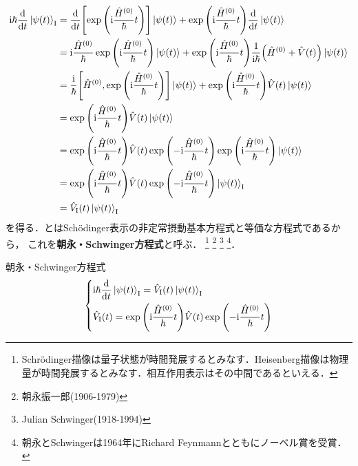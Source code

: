 \documentclass{report}
\begin{document}
  \begin{align}
    \mathrm{i}\hbar\dv{t}\ket{\psi(t)}_{\mathrm{I}} &= \dv{t}\qty[\exp\qty(\mathrm{i}\frac{\hat{H}^{(0)}}{\hbar}t)]\ket{\psi(t)} + \exp\qty(\mathrm{i}\frac{\hat{H}^{(0)}}{\hbar}t)\dv{t}\ket{\psi(t)} \\
    &= \mathrm{i}\frac{\hat{H}^{(0)}}{\hbar}\exp\qty(\mathrm{i}\frac{\hat{H}^{(0)}}{\hbar}t)\ket{\psi(t)} + \exp\qty(\mathrm{i}\frac{\hat{H}^{(0)}}{\hbar}t)\frac{1}{\mathrm{i}\hbar}\qty(\hat{H}^{(0)} + \hat{V}(t))\ket{\psi(t)} \\ 
    &= \frac{\mathrm{i}}{\hbar}\qty[\hat{H}^{(0)}, \exp\qty(\mathrm{i}\frac{\hat{H}^{(0)}}{\hbar}t)]\ket{\psi(t)} + \exp\qty(\mathrm{i}\frac{\hat{H}^{(0)}}{\hbar}t)\hat{V}(t)\ket{\psi(t)} \\ 
    &= \exp\qty(\mathrm{i}\frac{\hat{H}^{(0)}}{\hbar}t)\hat{V}(t)\ket{\psi(t)} \\
    &= \exp\qty(\mathrm{i}\frac{\hat{H}^{(0)}}{\hbar}t)\hat{V}(t)\exp\qty(-\mathrm{i}\frac{\hat{H}^{(0)}}{\hbar}t)\exp\qty(\mathrm{i}\frac{\hat{H}^{(0)}}{\hbar}t)\ket{\psi(t)} \\
    &= \exp\qty(\mathrm{i}\frac{\hat{H}^{(0)}}{\hbar}t)\hat{V}(t)\exp\qty(-\mathrm{i}\frac{\hat{H}^{(0)}}{\hbar}t)\ket{\psi(t)}_{\mathrm{I}} \\
    &= \hat{V}_{\mathrm{I}}(t)\ket{\psi(t)}_{\mathrm{I}}\label{time-dependent-schrodinger-eq-re-1st-eq-interaction-picture}
  \end{align}
  を得る．とはSch\"odinger表示の非定常摂動基本方程式と等価な方程式であるから，
  これを\textbf{朝永・Schwinger方程式}と呼ぶ．
  \footnote{Schrödinger描像は量子状態が時間発展するとみなす．Heisenberg描像は物理量が時間発展するとみなす．相互作用表示はその中間であるといえる．}  
  \footnote{朝永振一郎(1906-1979)}
  \footnote{Julian Schwinger(1918-1994)}
  \footnote{朝永とSchwingerは1964年にRichard Feynmannとともにノーベル賞を受賞．}．
  \begin{itembox}[l]{朝永・Schwinger方程式}
    \begin{align}
      \begin{dcases}
        \mathrm{i}\hbar\dv{t}\ket{\psi(t)}_{\mathrm{I}} = \hat{V}_{\mathrm{I}}(t)\ket{\psi(t)}_{\mathrm{I}} \label{tomonaga-schwinger}\\
        \hat{V}_{\mathrm{I}}(t) = \exp\qty(\mathrm{i}\frac{\hat{H}^{(0)}}{\hbar}t)\hat{V}(t)\exp\qty(-\mathrm{i}\frac{\hat{H}^{(0)}}{\hbar}t)
      \end{dcases}
    \end{align}
  \end{itembox}
  \par
\end{document}

